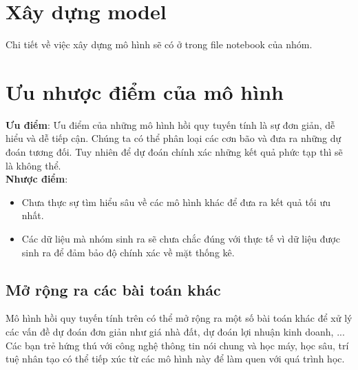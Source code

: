 \documentclass[12pt]{report}
\begin{document}
\section{Xây dựng model} %
\label{sec:xây_dựng_model}
\begin{flushleft}
	Chi tiết về việc xây dựng mô hình sẽ có ở trong file notebook của nhóm.
\end{flushleft}

\section{Ưu nhược điểm của mô hình} %
\label{sec:ưu_nhược_điểm_của_mô_hình}
\begin{flushleft}
	\textbf{Ưu điểm}: Ưu điểm của những mô hình hồi quy tuyến tính là sự đơn giản, dễ hiểu và dễ tiếp cận. Chúng ta có thể phân loại các cơn bão và đưa ra những dự đoán tương đối. Tuy nhiên để dự đoán chính xác những kết quả phức tạp thì sẽ là không thể.
	\\[\baselineskip]

	\textbf{Nhược điểm}:
	\begin{itemize}
		\item Chưa thực sự tìm hiểu sâu về các mô hình khác để đưa ra kết quả tối ưu nhất.

		\item Các dữ liệu mà nhóm sinh ra sẽ chưa chắc đúng với thực tế vì dữ liệu được sinh ra để đảm bảo độ chính xác về mặt thống kê.
	\end{itemize}
\end{flushleft}

\subsection{Mở rộng ra các bài toán khác} %
\label{ssub:mở_rộng_ra_các_bài_toán_khác}
\begin{flushleft}
	Mô hình hồi quy tuyến tính trên có thể mở rộng ra một số bài toán khác để xử lý các vấn đề dự đoán đơn giản như giá nhà đất, dự đoán lợi nhuận kinh doanh, ...
	\\[\baselineskip]

	Các bạn trẻ hứng thú với công nghệ thông tin nói chung và học máy, học sâu, trí tuệ nhân tạo có thể tiếp xúc từ các mô hình này để làm quen với quá trình học.
\end{flushleft}
\end{document}
